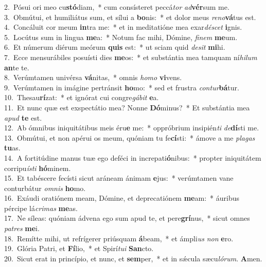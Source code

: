 {2.~}Pósui ori meo cu\textbf{stó}diam,~* cum consísteret peccá\textit{tor} \textit{ad}\textbf{vér}sum me.\\
{3.~}Obmútui, et humiliátus sum, et sílui a \textbf{bo}nis:~* et dolor meus \textit{re}\textit{no}\textbf{vá}tus est.\\
{4.~}Concáluit cor meum \textbf{in}tra me:~* et in meditatióne mea exar\textit{dé}\textit{scet} \textbf{i}gnis.\\
{5.~}Locútus sum in lingua \textbf{me}a:~* Notum fac mihi, Dómine, \textit{fi}\textit{nem} \textbf{me}um.\\
{6.~}Et númerum diérum meórum \textbf{quis} est:~* ut sciam quid \textit{de}\textit{sit} \textbf{mi}hi.\\
{7.~}Ecce mensurábiles posuísti dies \textbf{me}os:~* et substántia mea tamquam ní\textit{hi}\textit{lum} \textbf{an}te te.\\
{8.~}Verúmtamen univérsa \textbf{vá}nitas,~* omnis \textit{ho}\textit{mo} \textbf{vi}vens.\\
{9.~}Verúmtamen in imágine pertránsit \textbf{ho}mo:~* sed et frustra \textit{con}\textit{tur}\textbf{bá}tur.\\
{10.~}Thesau\textbf{rí}zat:~* et ignórat cui congre\textit{gá}\textit{bit} \textbf{e}a.\\
{11.~}Et nunc quæ est exspectátio mea? Nonne \textbf{Dó}minus?~* Et substántia mea \textit{a}\textit{pud} \textbf{te} est.\\
{12.~}Ab ómnibus iniquitátibus meis éru\textbf{e} me:~* oppróbrium insipién\textit{ti} \textit{de}\textbf{dí}sti me.\\
{13.~}Obmútui, et non apérui os meum, quóniam tu fe\textbf{cí}sti:~* ámove a me \textit{pla}\textit{gas} \textbf{tu}as.\\
{14.~}A fortitúdine manus tuæ ego deféci in increpati\textbf{ó}nibus:~* propter iniquitátem corripu\textit{í}\textit{sti} \textbf{hó}minem.\\
{15.~}Et tabéscere fecísti sicut aráneam ánimam \textbf{e}jus:~* verúmtamen vane conturbátur \textit{om}\textit{nis} \textbf{ho}mo.\\
{16.~}Exáudi oratiónem meam, Dómine, et deprecatiónem \textbf{me}am:~* áuribus pércipe lá\textit{cri}\textit{mas} \textbf{me}as.\\
{17.~}Ne síleas: quóniam ádvena ego sum apud te, et pere\textbf{grí}nus,~* sicut omnes \textit{pa}\textit{tres} \textbf{me}i.\\
{18.~}Remítte mihi, ut refrígerer priúsquam \textbf{á}beam,~* et ámpli\textit{us} \textit{non} \textbf{e}ro.\\
{19.~}Glória Patri, et \textbf{Fí}lio,~* et Spirí\textit{tu}\textit{i} \textbf{San}cto.\\
{20.~}Sicut erat in princípio, et nunc, et \textbf{sem}per,~* et in sǽcula sæcu\textit{ló}\textit{rum}. \textbf{A}men.\\
